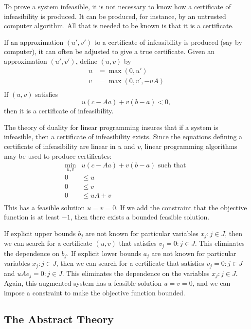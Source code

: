 To prove a system infeasible, it is not necessary to know how a
certificate of infeasibility is produced.  It can be produced, for
instance, by an untrusted computer algorithm.  All that is needed
to be known is that it is a certificate.

If an approximation $(u',v')$ to a certificate of infeasibility is
produced (say by computer), it can often be adjusted to give a
true certificate.  Given an approximation $(u',v')$, define
$(u,v)$ by
    $$
    \begin{array}{lll}
    u &= \max(0,u')\\
    v &= \max(0,v',-u A)\\
    \end{array}
    $$
If $(u,v)$ satisfies
    $$u( c-A a) + v(b-a) <0,$$
then it is a certificate of infeasibility.

The theory of duality for linear programming insures that if a
system is infeasible, then a certificate of infeasibility exists.
Since the equations defining a certificate of infeasibility are
linear in $u$ and $v$, linear programming algorithms may be used
to produce certificates:
    $$
    \begin{array}{rll}
        \min_{u,v} &u (c-A a) + v(b-a) \text{ such that }\\
        0 &\le u\\
        0 &\le v \\
        0& \le u A + v\\
    \end{array}
    $$
This has a feasible solution $u=v=0$.  If we add the constraint
that the objective function is at least $-1$, then there exists a
bounded feasible solution.

\begin{remark}
\label{rem:bounded}
If explicit upper bounds $b_j$  are not known
for particular variables $x_j:j\in J$, then we can search for a
certificate $(u,v)$ that satisfies $v_j = 0:j\in J$.  This
eliminates the dependence on $b_j$.  If explicit lower bounds
$a_j$ are not known for particular variables $x_j:j\in J$, then we
can search for a certificate that satisfies $v_j = 0:j\in J$ and
$u A e_j = 0: j\in J$. This eliminates the dependence on the
variables $x_j:j\in J$. Again, this augmented system has a
feasible solution $u=v=0$, and we can impose a constraint to make
the objective function bounded.
\end{remark}

\subsection{The Abstract Theory}


